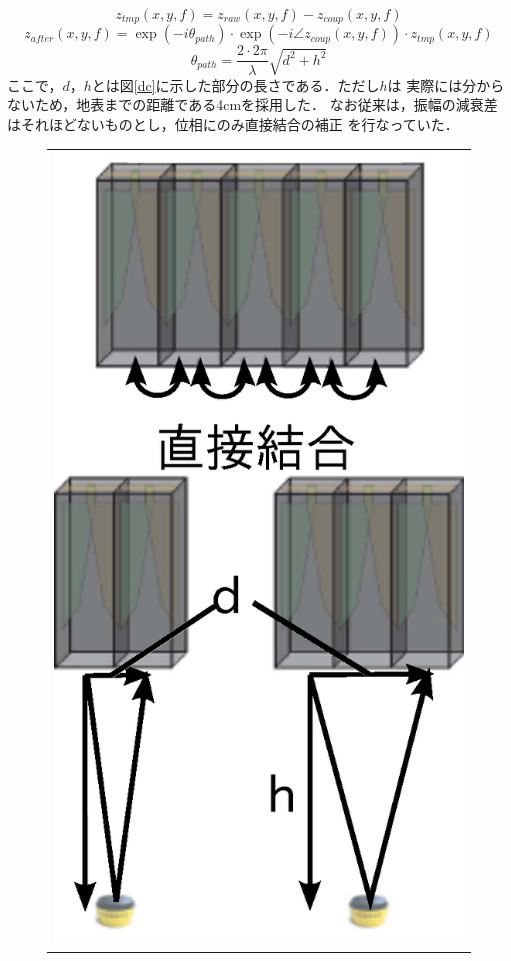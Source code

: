 ﻿\documentclass[12pt,oneside]{jsbook}
\begin{document}
\begin{equation}
 z_{tmp}(x,y,f)=z_{raw}(x,y,f)-z_{coup}(x,y,f)
\end{equation}
\begin{equation}
 z_{after}(x,y,f)=\exp(-i\theta_{path})\cdot\exp(-i\angle z_{coup}(x,y,f))\cdot z_{tmp}(x,y,f)
\end{equation}
\begin{equation}
 \theta_{path}=\frac{2\cdot2\pi}{\lambda} \sqrt{d^2+h^2}
\end{equation}
ここで，$d$，$h$とは図\ref{dc}に示した部分の長さである．ただし$h$は
実際には分からないため，地表までの距離である4cmを採用した．
なお従来は，振幅の減衰差はそれほどないものとし，位相にのみ直接結合の補正
を行なっていた．
\begin{figure}[btp]
 \begin{center}
  \begin{tabular}{c}
   \begin{minipage}{0.4\hsize}
\includegraphics[width =\hsize ]{directcoup.eps}

\end{minipage}
\end{tabular}
\end{center}
\end{figure}
\end{document}
